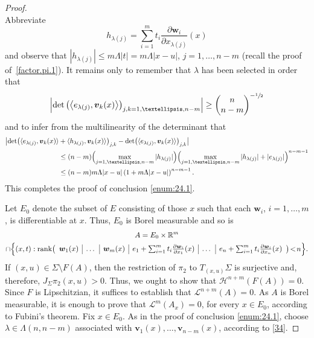 \documentclass[11pt]{article}
\theoremstyle{definition}
\theoremstyle{jepanonymous}
\theoremstyle{plain}
\newcommand{\R}{\mathbb{R}}
\newcommand{\Rm}{\R^m}
\newcommand{\calH}{\mathscr{H}}
\newcommand{\calL}{\mathscr{L}}
\newcommand{\bv}{{\boldsymbol{v}}}
\newcommand{\bw}{{\boldsymbol{w}}}
\DeclareMathOperator{\rmrank}{\mathrm{rank}}
\newcommand{\bin}[2]{
\begin{pmatrix} #1 \\
#2
\end{pmatrix}}
\let\la\langle
\let\ra\rangle
\begin{document}
\begin{proof}
\begin{equation}
\end{equation}
Abbreviate
\begin{equation*}
h_{\lambda(j)} = \sum_{i=1}^m t_i \frac{\partial \bw_i}{\partial x_{\lambda(j)}}(x)
\end{equation*}
and observe that $\left| h_{\lambda(j)} \right| \leq m \Lambda |t| = m \Lambda |x-u|$, $j=1,\ldots,n-m$ (recall the proof of~\ref{factor.pi.1}).
It remains only to remember that $\lambda$ has been selected in order that
\begin{equation*}
\left| \det \left(\left\la e_{\lambda(j)}, \bv_k(x)\right\ra\right)_{j,k=1,\ldots,n-m} \right| \geq \bin{n}{n-m}^{-\sfrac{1}{2}}
\end{equation*}
and to infer from the multilinearity of the determinant that
\begin{align*}
\bigl| \det \bigl(\la e_{\lambda(j)}, \bv_k(x)\ra &+\la h_{\lambda(j)}, \bv_k(x)\ra\bigr)_{j,k} - \det \bigl(\la e_{\lambda(j)}, \bv_k(x)\ra\bigr)_{j,k}\bigr| \\
&\leq (n-m) \Bigl(\max_{j=1,\ldots,n-m} | h_{\lambda(j)}|\Bigr)\Bigl(\max_{j=1,\ldots,n-m} | h_{\lambda(j)}| + | e_{\lambda(j)}|\Bigr)^{n-m-1} \\
&\leq (n-m)m\Lambda|x-u| \left(1 + m \Lambda |x-u|\right)^{n-m-1}.
\end{align*}
This completes the proof of conclusion \eqref{enum:24.1}.
\par
Let $E_0$ denote the subset of $E$ consisting of those $x$ such that each $\bw_i$, $i=1,\ldots,m$, is differentiable at $x$.
Thus, $E_0$ is Borel measurable and so is
\begin{multline*}
A = E_0 \times \Rm\\
\cap \Bigl\{ (x,t): \rmrank
\bigl(
\begin{array}{c|c|c|c|c|c}
\bw_1(x) & \dots & \bw_m(x) & e_1 + \sum_{i=1}^m t_i \frac{\partial \bw_i}{\partial x_1}(x) & \ldots & e_n + \sum_{i=1}^m t_i \frac{\partial \bw_i}{\partial x_n}(x)
\end{array}
\bigr) \!<\! n
\Bigr\}.
\end{multline*}
If $(x,u) \in \Sigma \setminus F(A)$, then the restriction of $\pi_2$ to $T_{(x,u)}\Sigma$ is surjective and, therefore, $J_\Sigma \pi_2(x,u) > 0$.
Thus, we ought to show that $\calH^{n+m}(F(A))=0$.
Since $F$ is Lipschitzian, it suffices to establish that $\calL^{n+m}(A)=0$.
As $A$ is Borel measurable, it is enough to prove that $\calL^m(A_x)=0$, for every $x \in E_0$, according to Fubini's theorem.
Fix $x \in E_0$.
As in the proof of conclusion \eqref{enum:24.1}, choose $\lambda \in \Lambda(n,n-m)$ associated with $\bv_1(x),\ldots,\bv_{n-m}(x)$, according to \ref{34}.

\end{proof}
\end{document}
